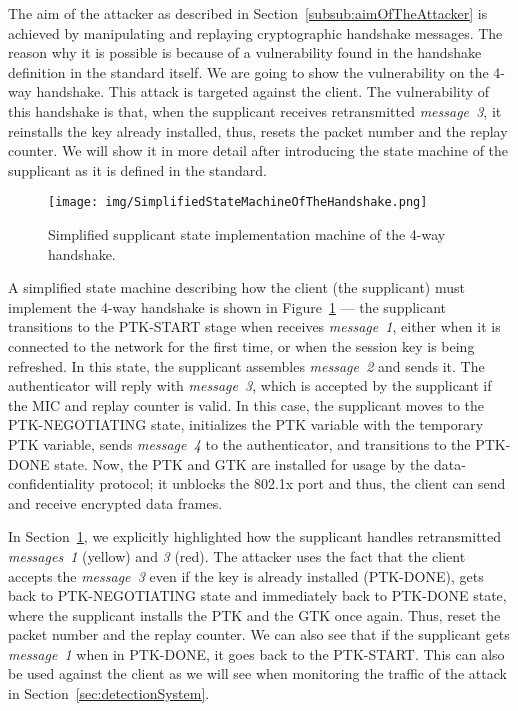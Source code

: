 The aim of the attacker as described in Section~\ref{subsub:aimOfTheAttacker} is achieved by manipulating and replaying cryptographic handshake messages. The reason why it is possible is because of a vulnerability found in the handshake definition in the standard itself. We are going to show the vulnerability on the 4-way handshake. This attack is targeted against the client. The vulnerability of this handshake is that, when the supplicant receives retransmitted \textit{message~3}, it reinstalls the key already installed, thus, resets the packet number and the replay counter. We will show it in more detail after introducing the state machine of the supplicant as it is defined in the standard.

\begin{figure}[h!]
  \centering
  \texttt{[image: img/SimplifiedStateMachineOfTheHandshake.png]}
  \caption[Simplified supplicant state machine of the 4-way handshake]{Simplified supplicant state implementation machine of the 4-way handshake.}
  \label{fig:stateMachineSupplicant}
\end{figure}

A simplified state machine describing how the client (the supplicant) must implement the 4-way handshake is shown in Figure~\ref{fig:stateMachineSupplicant} --- the supplicant transitions to the PTK-START stage when receives \textit{message~1}, either when it is connected to the network for the first time, or when the session key is being refreshed. In this state, the supplicant assembles \textit{message~2} and sends it. The authenticator will reply with \textit{message~3}, which is accepted by the supplicant if the MIC and replay counter is valid. In this case, the supplicant moves to the PTK-NEGOTIATING state, initializes the PTK variable with the temporary PTK variable, sends \textit{message~4} to the authenticator, and transitions to the PTK-DONE state. Now, the PTK and GTK are installed for usage by the data-confidentiality protocol; it unblocks the 802.1x port and thus, the client can send and receive encrypted data frames.~\cite{revision2016}

In Section~\ref{fig:stateMachineSupplicant}, we explicitly highlighted how the supplicant handles retransmitted \textit{messages~1} (yellow) and \textit{3} (red). The attacker uses the fact that the client accepts the \textit{message~3} even if the key is already installed (PTK-DONE), gets back to PTK-NEGOTIATING state and immediately back to PTK-DONE state, where the supplicant installs the PTK and the GTK once again. Thus, reset the packet number and the replay counter. We can also see that if the supplicant gets \textit{message~1} when in PTK-DONE, it goes back to the PTK-START. This can also be used against the client as we will see when monitoring the traffic of the attack in Section~\ref{sec:detectionSystem}.

